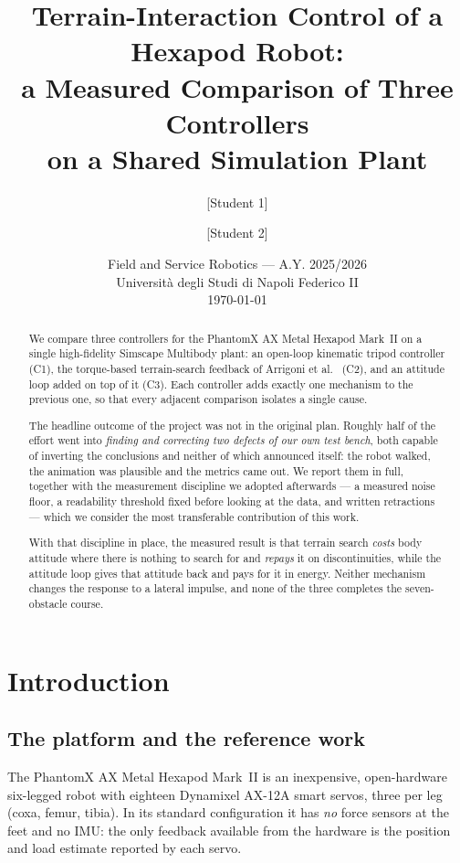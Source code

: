 \documentclass[11pt,a4paper]{article}
\title{\textbf{Terrain-Interaction Control of a Hexapod Robot:\\
a Measured Comparison of Three Controllers\\ on a Shared Simulation Plant}}
\author{[Student 1] \and [Student 2]}
\date{Field and Service Robotics --- A.Y. 2025/2026\\
Universit\`a degli Studi di Napoli Federico II\\[4pt]
\today}
\newcommand{\Co}{\textsf{C1}}
\newcommand{\Ct}{\textsf{C2}}
\newcommand{\Cth}{\textsf{C3}}
\begin{document}
\maketitle

\begin{abstract}
\noindent
We compare three controllers for the PhantomX AX Metal Hexapod Mark~II on a
single high-fidelity Simscape Multibody plant: an open-loop kinematic tripod
controller (\Co), the torque-based terrain-search feedback of Arrigoni et
al.~\cite{arrigoni2024} (\Ct), and an attitude loop added on top of it
(\Cth). Each controller adds exactly one mechanism to the previous one, so
that every adjacent comparison isolates a single cause.

The headline outcome of the project was not in the original plan. Roughly half
of the effort went into \emph{finding and correcting two defects of our own
test bench}, both capable of inverting the conclusions and neither of which
announced itself: the robot walked, the animation was plausible and the
metrics came out. We report them in full, together with the measurement
discipline we adopted afterwards --- a measured noise floor, a readability
threshold fixed before looking at the data, and written retractions --- which
we consider the most transferable contribution of this work.

With that discipline in place, the measured result is that terrain search
\emph{costs} body attitude where there is nothing to search for and
\emph{repays} it on discontinuities, while the attitude loop gives that
attitude back and pays for it in energy. Neither mechanism changes the
response to a lateral impulse, and none of the three completes the
seven-obstacle course.
\end{abstract}

\tableofcontents
\newpage

\section{Introduction}
\label{sec:intro}

\subsection{The platform and the reference work}

The PhantomX AX Metal Hexapod Mark~II is an inexpensive, open-hardware
six-legged robot with eighteen Dynamixel AX-12A smart servos, three per leg
(coxa, femur, tibia). In its standard configuration it has \emph{no} force
sensors at the feet and no IMU: the only feedback available from the hardware
is the position and load estimate reported by each servo.
\end{document}
